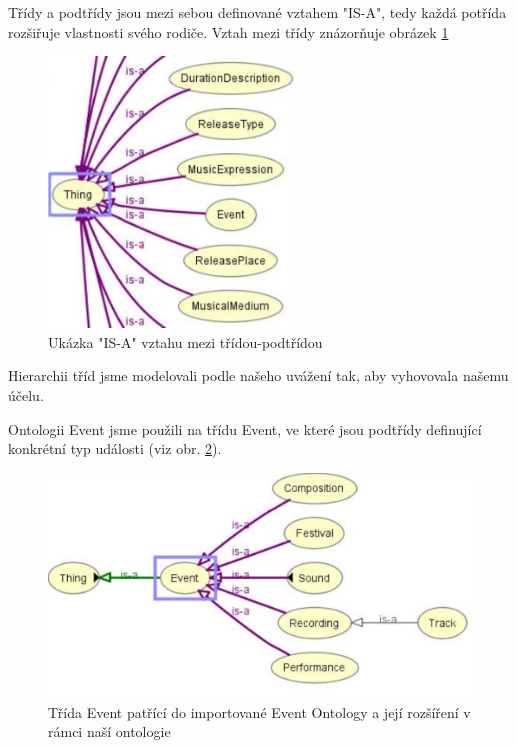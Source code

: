 Třídy a podtřídy jsou mezi sebou definované vztahem "IS-A", tedy každá potřída rozšiřuje vlastnosti svého rodiče. Vztah mezi třídy znázorňuje obrázek \ref{img:thing}

\begin{figure}[h]
\begin{center}
\includegraphics[width=6.5cm]{figures/thing}
\caption{Ukázka "IS-A" vztahu mezi třídou-podtřídou}
\label{img:thing}
\end{center}
\end{figure}

Hierarchii tříd jsme modelovali podle našeho uvážení tak, aby vyhovovala našemu účelu. 

Ontologii Event jsme použili na třídu Event, ve které jsou podtřídy definující konkrétní typ události (viz obr. \ref{img:event}).

\begin{figure}[h]
\begin{center}
\includegraphics[width=13cm]{figures/event}
\caption{Třída Event patřící do importované Event Ontology a její rozšíření v rámci naší ontologie}
\label{img:event}
\end{center}
\end{figure}


